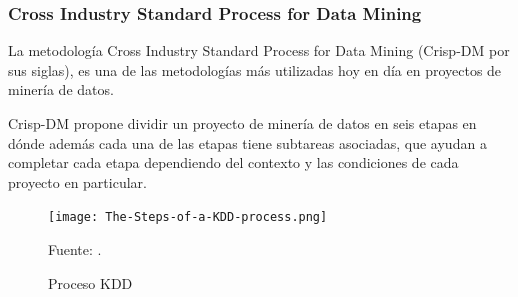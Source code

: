 \subsubsection{Cross Industry Standard Process for Data Mining}
    La metodología Cross Industry Standard Process for Data Mining \cite{wirth2000crisp} (Crisp-DM por sus siglas), es una de las metodologías más utilizadas hoy en día en proyectos de minería de datos. 
    
    Crisp-DM propone dividir un proyecto de minería de datos en seis etapas en dónde además cada una de las etapas tiene subtareas asociadas, que ayudan a completar cada etapa dependiendo del contexto y las condiciones de cada proyecto en particular. 
    
    \begin{figure}[H]
    \centering
    \texttt{[image: The-Steps-of-a-KDD-process.png]}
    \caption{\label{fig:KDD} Proceso KDD} Fuente: \cite{fayyad1996kdd}.
\end{figure}
    
